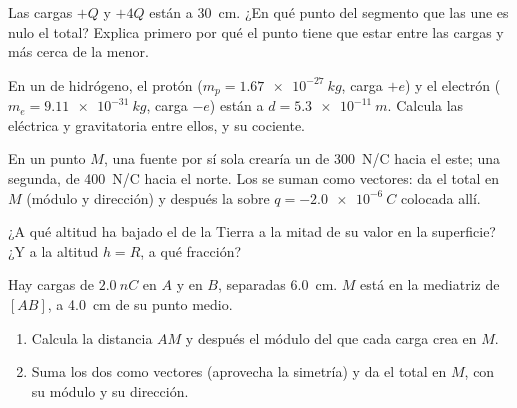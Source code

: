 \begin{exercise}[$\star\star$]\label{exo:g11:electric-gravitational-fields:9}
Las cargas $+Q$ y $+4Q$ están a \qty{30}{cm}. ¿En qué punto del segmento
que las une es nulo el  total? Explica primero por qué el punto
tiene que estar entre las cargas y más cerca de la menor.
\end{exercise}

\begin{exercise}[$\star\star$]\label{exo:g11:electric-gravitational-fields:10}
En un  de hidrógeno, el protón ($m_p = \qty{1.67e-27}{kg}$, carga
$+e$) y el electrón ($m_e = \qty{9.11e-31}{kg}$, carga $-e$) están a
$d = \qty{5.3e-11}{m}$. Calcula las  eléctrica y gravitatoria
entre ellos, y su cociente.
\end{exercise}

\begin{exercise}[$\star\star$]\label{exo:g11:electric-gravitational-fields:11}
En un punto $M$, una fuente por sí sola crearía un  de
\qty{300}{N/C} hacia el este; una segunda, de \qty{400}{N/C} hacia el
norte. Los  se suman como vectores: da el  total en $M$
(módulo y dirección) y después la  sobre
$q = \qty{-2.0e-6}{C}$ colocada allí.
\end{exercise}

\begin{exercise}[$\star\star\star$]\label{exo:g11:electric-gravitational-fields:12}
¿A qué altitud ha bajado el  de la Tierra a la mitad de su valor en
la superficie? ¿Y a la altitud $h = R$, a qué fracción?
\end{exercise}

\begin{exercise}[$\star\star\star$]\label{exo:g11:electric-gravitational-fields:13}
Hay cargas de $\qty{+2.0}{nC}$ en $A$ y en $B$, separadas
\qty{6.0}{cm}. $M$ está en la mediatriz de $[AB]$, a \qty{4.0}{cm} de su
punto medio.
\begin{enumerate}
  \item Calcula la distancia $AM$ y después el módulo del  que cada
        carga crea en $M$.
  \item Suma los dos  como vectores (aprovecha la simetría) y da
        el  total en $M$, con su módulo y su dirección.
\end{enumerate}
\end{exercise}

